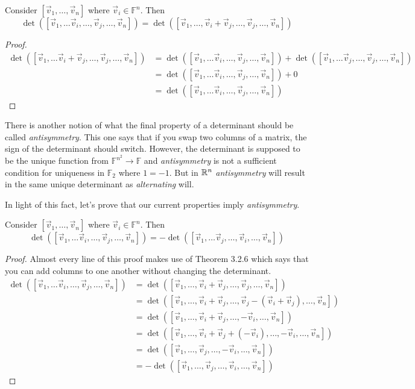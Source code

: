 \begin{theorem}
    Consider $[\vec{v}_1,\dots,\vec{v}_n]$ where $\vec{v}_i\in\mathbb{F}^n$. Then
    $$\det([\vec{v}_1,\dots\vec{v}_i,\dots,\vec{v}_j,\dots,\vec{v}_n])=\det([\vec{v}_1,\dots,\vec{v}_i+\vec{v}_j,\dots,\vec{v}_j,\dots,\vec{v}_n])$$
\end{theorem}
\begin{proof}
    \begin{align*}
        \det([\vec{v}_1,\dots\vec{v}_i+\vec{v}_j,\dots,\vec{v}_j,\dots,\vec{v}_n])&=\det([\vec{v}_1,\dots\vec{v}_i,\dots,\vec{v}_j,\dots,\vec{v}_n])+\det([\vec{v}_1,\dots\vec{v}_j,\dots,\vec{v}_j,\dots,\vec{v}_n])\tag{by multi-linearity}\\
        &=\det([\vec{v}_1,\dots\vec{v}_i,\dots,\vec{v}_j,\dots,\vec{v}_n])+0\tag{by alternating}\\
        &=\det([\vec{v}_1,\dots\vec{v}_i,\dots,\vec{v}_j,\dots,\vec{v}_n])
    \end{align*}
\end{proof}
\begin{remark}
    There is another notion of what the final property of a determinant should be called \textit{antisymmetry}. This one says that if you swap two columns of a matrix, the sign of the determinant should switch. However, the determinant is supposed to be the unique function from $\mathbb{F}^{n^2}\to\mathbb{F}$ and \textit{antisymmetry} is not a sufficient condition for uniqueness in $\mathbb{F}_2$ where $1=-1$. But in $\mathbb{R}^n$ \textit{antisymmetry} will result in the same unique determinant as \textit{alternating} will.
\end{remark}
In light of this fact, let's prove that our current properties imply \textit{antisymmetry}.
\begin{theorem}
    Consider $[\vec{v}_1,\dots,\vec{v}_n]$ where $\vec{v}_i\in\mathbb{F}^n$. Then $$\det([\vec{v}_1,\dots\vec{v}_i,\dots,\vec{v}_j,\dots,\vec{v}_n])=-\det([\vec{v}_1,\dots\vec{v}_j,\dots,\vec{v}_i,\dots,\vec{v}_n])$$
\end{theorem}
\begin{proof}
Almost every line of this proof makes use of Theorem 3.2.6 which says that you can add columns to one another without changing the determinant.
    \begin{align*}
        \det([\vec{v}_1,\dots\vec{v}_i,\dots,\vec{v}_j,\dots,\vec{v}_n])&=\det([\vec{v}_1,\dots,\vec{v}_i+\vec{v}_j,\dots,\vec{v}_j,\dots,\vec{v}_n])\\
        &=\det([\vec{v}_1,\dots,\vec{v}_i+\vec{v}_j,\dots,\vec{v}_j-(\vec{v}_i+\vec{v}_j),\dots,\vec{v}_n])\\
        &=\det([\vec{v}_1,\dots,\vec{v}_i+\vec{v}_j,\dots,-\vec{v}_i,\dots,\vec{v}_n])\\
        &=\det([\vec{v}_1,\dots,\vec{v}_i+\vec{v}_j+(-\vec{v}_i),\dots,-\vec{v}_i,\dots,\vec{v}_n])\\
        &=\det([\vec{v}_1,\dots,\vec{v}_j,\dots,-\vec{v}_i,\dots,\vec{v}_n])\\
        &=-\det([\vec{v}_1,\dots,\vec{v}_j,\dots,\vec{v}_i,\dots,\vec{v}_n])\tag{by multi-linearity}
    \end{align*}
\end{proof}

